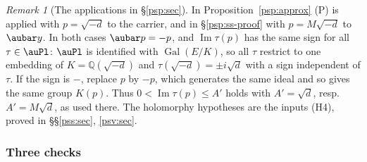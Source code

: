 \documentclass[10pt]{amsart}
\theoremstyle{definition}
\theoremstyle{remark}
\newtheorem{remark}[theorem]{Remark}
\newcommand{\Q}{\mathbb Q}
\newcommand{\Iml}{\operatorname{Im}}
\begin{document}
\begin{remark}[The applications in \S\ref{psp:sec}]\label{psq:Papp}
In Proposition~\ref{psp:approx} (P) is applied with $p=\sqrt{-d}$ to the carrier, and in
\S\ref{psp:ss-proof} with $p=M\sqrt{-d}$ to $\aubar y$. In both cases $\aubar p=-p$, and
$\Iml\tau(p)$ has the same sign for all $\tau\in\auPl$: $\auPl$ is identified with
$\operatorname{Gal}(E/K)$, so all $\tau$ restrict to one embedding of $K=\Q(\sqrt{-d})$ and
$\tau(\sqrt{-d})=\pm i\sqrt d$ with a sign independent of $\tau$. If the sign is $-$, replace $p$ by
$-p$, which generates the same ideal and so gives the same group $K(p)$. Thus $0<\Iml\tau(p)\le A'$
holds with $A'=\sqrt d$, resp.\ $A'=M\sqrt d$, as used there. The holomorphy hypotheses are the
inputs (H4), proved in \S\S\ref{pss:sec}, \ref{psv:sec}.
\end{remark}

\subsubsection{Three checks}\label{psq:ss-checks}
\end{document}
